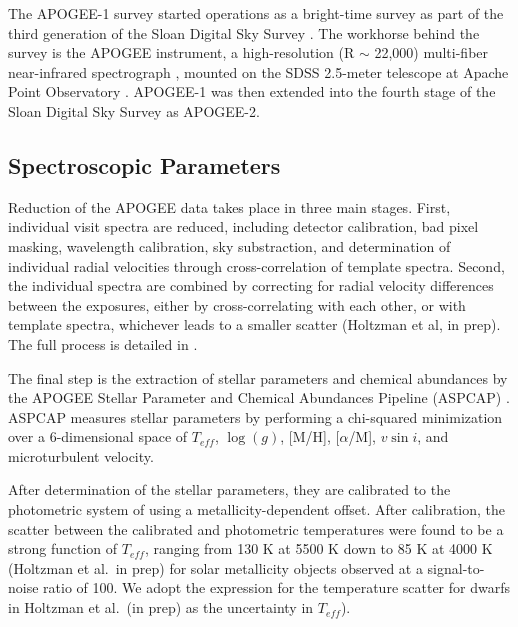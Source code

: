 \documentclass[manuscript]{aastex6}
\newcommand{\vsini}{\ensuremath{v \sin i}}
\newcommand{\Teff}{\ensuremath{T_{eff}}}
\newcommand{\logg}{\ensuremath{\log(g)}}
\begin{document}
The APOGEE-1 survey \citep{Majewski13} started operations as a bright-time
survey as part of the third generation of the Sloan Digital Sky Survey
\citep{Eisenstein11}. The workhorse behind the survey is the APOGEE instrument,
a high-resolution (R \(\sim\) 22,000) multi-fiber near-infrared spectrograph
\citep{Wilson10}, mounted on the SDSS 2.5-meter telescope at Apache Point
Observatory \citep{Gunn06}. APOGEE-1 was then extended into the fourth stage of
the Sloan Digital Sky Survey \citep{Blanton17} as APOGEE-2.


\subsection{Spectroscopic Parameters}

Reduction of the APOGEE data takes place in three main stages. First,
individual visit spectra are reduced, including detector calibration, bad pixel
masking, wavelength calibration, sky substraction, and determination of
individual radial velocities through cross-correlation of template spectra.
Second, the individual spectra are combined by correcting for radial velocity
differences between the exposures, either by cross-correlating with each other,
or with template spectra, whichever leads to a smaller scatter (Holtzman et
al, in prep). The full process is detailed in \citet{Nidever15}.

The final step is the extraction of stellar parameters and chemical abundances
by the APOGEE Stellar Parameter and Chemical Abundances Pipeline (ASPCAP)
\citep{GarciaPerez16}. ASPCAP measures stellar parameters by performing a
chi-squared minimization \citep{AllendePrieto06} over a 6-dimensional space of
\Teff, \logg, [M/H], [\(\alpha\)/M], \vsini, and microturbulent velocity.

After determination of the stellar parameters, they are calibrated to the
photometric system of \citet{GonzalezHernandez09} using a metallicity-dependent
offset. After calibration, the scatter between the calibrated and photometric
temperatures  were found to be a strong function of \Teff{}, ranging from 130 
K at 5500 K down to 85 K at 4000 K (Holtzman et al.\ in prep) for solar
metallicity objects observed at a signal-to-noise ratio of 100. We adopt the
expression for the temperature scatter for dwarfs in Holtzman et al.\ (in prep) 
as the uncertainty in \Teff).
\end{document}
